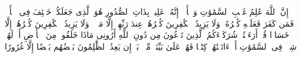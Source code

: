 \stopbuffer%
\startbuffer[\q:35:38]
إِنَّ ٱللَّهَ عَٰلِمُ غَیۡبِ ٱلسَّمَٰوَٰتِ وَٱلۡأَرۡضِۚ إِنَّهُۥ عَلِیمُۢ بِذَاتِ ٱلصُّدُورِ%
\stopbuffer%
\startbuffer[\q:35:39]
هُوَ ٱلَّذِی جَعَلَكُمۡ خَلَٰۤئِفَ فِی ٱلۡأَرۡضِۚ فَمَن كَفَرَ فَعَلَیۡهِ كُفۡرُهُۥۖ وَلَا یَزِیدُ ٱلۡكَٰفِرِینَ كُفۡرُهُمۡ عِندَ رَبِّهِمۡ إِلَّا مَقۡتࣰاۖ وَلَا یَزِیدُ ٱلۡكَٰفِرِینَ كُفۡرُهُمۡ إِلَّا خَسَارࣰا%
\stopbuffer%
\startbuffer[\q:35:40]
قُلۡ أَرَءَیۡتُمۡ شُرَكَاۤءَكُمُ ٱلَّذِینَ تَدۡعُونَ مِن دُونِ ٱللَّهِ أَرُونِی مَاذَا خَلَقُوا۟ مِنَ ٱلۡأَرۡضِ أَمۡ لَهُمۡ شِرۡكࣱ فِی ٱلسَّمَٰوَٰتِ أَمۡ ءَاتَیۡنَٰهُمۡ كِتَٰبࣰا فَهُمۡ عَلَىٰ بَیِّنَتࣲ مِّنۡهُۚ بَلۡ إِن یَعِدُ ٱلظَّٰلِمُونَ بَعۡضُهُم بَعۡضًا إِلَّا غُرُورًا%
\stopbuffer%
